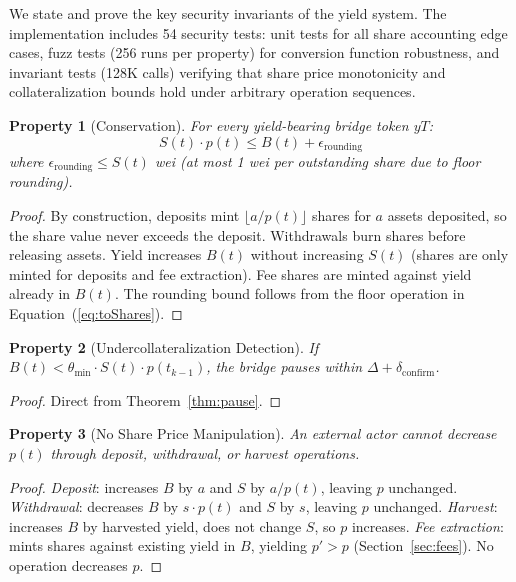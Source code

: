 \documentclass[11pt,twocolumn]{article}
\newtheorem{property}{Property}[section]
\begin{document}
We state and prove the key security invariants of the yield system. The implementation includes 54 security tests: unit tests for all share accounting edge cases, fuzz tests (256 runs per property) for conversion function robustness, and invariant tests (128K calls) verifying that share price monotonicity and collateralization bounds hold under arbitrary operation sequences.

\begin{property}[Conservation]\label{prop:conservation}
For every yield-bearing bridge token $yT$:
\begin{equation}
  S(t) \cdot p(t) \leq B(t) + \epsilon_{\text{rounding}}
\end{equation}
where $\epsilon_{\text{rounding}} \leq S(t)$ wei (at most 1 wei per outstanding share due to floor rounding).
\end{property}

\begin{proof}
By construction, deposits mint $\lfloor a / p(t) \rfloor$ shares for $a$ assets deposited, so the share value never exceeds the deposit. Withdrawals burn shares before releasing assets. Yield increases $B(t)$ without increasing $S(t)$ (shares are only minted for deposits and fee extraction). Fee shares are minted against yield already in $B(t)$. The rounding bound follows from the floor operation in Equation~(\ref{eq:toShares}).
\end{proof}

\begin{property}[Undercollateralization Detection]
If $B(t) < \theta_{\min} \cdot S(t) \cdot p(t_{k-1})$, the bridge pauses within $\Delta + \delta_{\text{confirm}}$.
\end{property}

\begin{proof}
Direct from Theorem~\ref{thm:pause}.
\end{proof}

\begin{property}[No Share Price Manipulation]
An external actor cannot decrease $p(t)$ through deposit, withdrawal, or harvest operations.
\end{property}

\begin{proof}
\textit{Deposit}: increases $B$ by $a$ and $S$ by $a/p(t)$, leaving $p$ unchanged.
\textit{Withdrawal}: decreases $B$ by $s \cdot p(t)$ and $S$ by $s$, leaving $p$ unchanged.
\textit{Harvest}: increases $B$ by harvested yield, does not change $S$, so $p$ increases.
\textit{Fee extraction}: mints shares against existing yield in $B$, yielding $p' > p$ (Section~\ref{sec:fees}).
No operation decreases $p$.
\end{proof}
\end{document}
